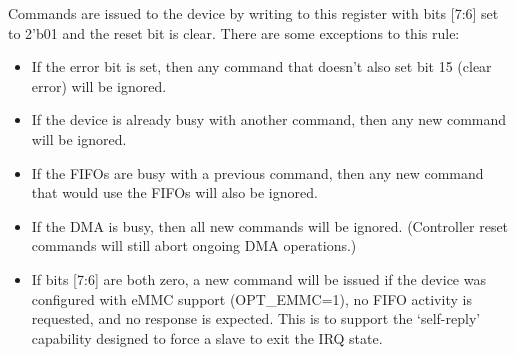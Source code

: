 \documentclass{gqtekspec}
\begin{document}
Commands are issued to the device by writing to this register with bits [7:6]
set to 2'b01 and the reset bit is clear.  There are some exceptions to this
rule:
\begin{itemize}
\item If the error bit is set, then any command that doesn't also set bit 15
	(clear error) will be ignored.
\item If the device is already busy with another command, then any new command
	will be ignored.
\item If the FIFOs are busy with a previous command, then any new command that
	would use the FIFOs will also be ignored.
\item If the DMA is busy, then all new commands will be ignored.  (Controller
	reset commands will still abort ongoing DMA operations.)
\item If bits [7:6] are both zero, a new command will be issued if the device
	was configured with eMMC support (OPT\_EMMC=1), no FIFO activity
	is requested, and no response is expected.  This is to support the
	`self-reply' capability designed to force a slave to exit the IRQ
	state.
\end{itemize}
\end{document}
